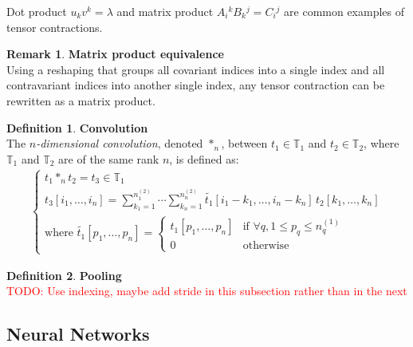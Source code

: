 \documentclass{article}
\theoremstyle{definition}
\newtheorem{definition}{Definition}[section]
\newtheorem{remark}{Remark}
\newcommand{\tspace}{\mathbb{T}}
\newcommand{\todo}[1]{\textcolor{red}{TODO: #1\\}}
\begin{document}
Dot product $u_k v^k = \lambda $ and matrix product $A_i\hspace{0pt}^k B_k\hspace{0pt}^j = C_i\hspace{0pt}^j$ are common examples of tensor contractions.

\begin{remark}\textbf{Matrix product equivalence}\\
Using a reshaping that groups all covariant indices into a single index and all contravariant indices into another single index, any tensor contraction can be rewritten as a matrix product.
\end{remark}

\begin{definition}\textbf{Convolution}\\
The \emph{$n$-dimensional convolution}, denoted $\ast_n$, between $t_1 \in \tspace_1$ and $t_2 \in \tspace_2$, where $\tspace_1$ and $\tspace_2$ are of the same rank $n$, is defined as:
\begin{gather*}
\left\{
  \begin{array}{l}
    t_1 \ast_n t_2 = t_3 \in \tspace_1 \\
    t_3[i_1, \ldots, i_n] =
    \displaystyle \sum_{k_1=1}^{n_1^{(2)}} \cdots \sum_{k_n=1}^{n_n^{(2)}}
    \widetilde{t_1}[i_1 - k_1, \ldots, i_n - k_n] \hspace{2pt} t_2[k_1, \ldots, k_n] \\
    \text{where } \widetilde{t_1}[p_1, \ldots, p_n] =
    \begin{cases}
      t_1[p_1, \ldots, p_n] & \text{if } \forall q, 1 \le p_q \le n_q^{(1)} \\
      0 & \text{otherwise}
    \end{cases}
  \end{array}
\right.
\end{gather*}
\end{definition}

\begin{definition}\textbf{Pooling}\\

\todo{Use indexing, maybe add stride in this subsection rather than in the next}

\end{definition}

\subsection{Neural Networks}
\end{document}
